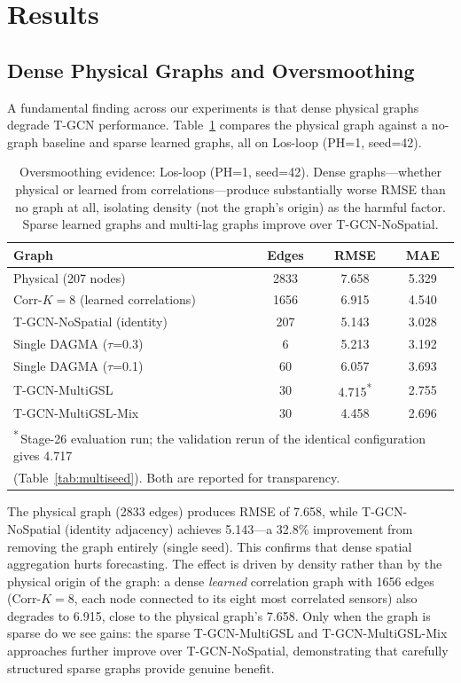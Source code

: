 \section{Results}\label{sec:results}

\subsection{Dense Physical Graphs and Oversmoothing}\label{sec:oversmoothing}

A fundamental finding across our experiments is that dense physical graphs degrade T-GCN performance. Table~\ref{tab:oversmoothing} compares the physical graph against a no-graph baseline and sparse learned graphs, all on Los-loop (PH=1, seed=42).

\begin{table}[t]
\centering
\caption{Oversmoothing evidence: Los-loop (PH=1, seed=42). Dense graphs---whether physical or learned from correlations---produce substantially worse RMSE than no graph at all, isolating density (not the graph's origin) as the harmful factor. Sparse learned graphs and multi-lag graphs improve over T-GCN-NoSpatial.}
\label{tab:oversmoothing}
\begin{tabular}{lccc}
\toprule
\textbf{Graph} & \textbf{Edges} & \textbf{RMSE} & \textbf{MAE} \\
\midrule
Physical (207 nodes) & 2833 & 7.658 & 5.329 \\
Corr-$K{=}8$ (learned correlations) & 1656 & 6.915 & 4.540 \\
T-GCN-NoSpatial (identity) & 207 & 5.143 & 3.028 \\
Single DAGMA ($\tau$=0.3) & 6 & 5.213 & 3.192 \\
Single DAGMA ($\tau$=0.1) & 60 & 6.057 & 3.693 \\
T-GCN-MultiGSL & 30 & 4.715\textsuperscript{*} & 2.755 \\
T-GCN-MultiGSL-Mix & 30 & 4.458 & 2.696 \\
\bottomrule
\multicolumn{4}{l}{\footnotesize \textsuperscript{*}\,Stage-26 evaluation run; the validation rerun of the identical configuration gives 4.717}\\
\multicolumn{4}{l}{\footnotesize (Table~\ref{tab:multiseed}). Both are reported for transparency.}
\end{tabular}
\end{table}

The physical graph (2833 edges) produces RMSE of 7.658, while T-GCN-NoSpatial (identity adjacency) achieves 5.143---a 32.8\% improvement from removing the graph entirely (single seed). This confirms that dense spatial aggregation hurts forecasting. The effect is driven by density rather than by the physical origin of the graph: a dense \emph{learned} correlation graph with 1656 edges (Corr-$K{=}8$, each node connected to its eight most correlated sensors) also degrades to 6.915, close to the physical graph's 7.658. Only when the graph is sparse do we see gains: the sparse T-GCN-MultiGSL and T-GCN-MultiGSL-Mix approaches further improve over T-GCN-NoSpatial, demonstrating that carefully structured sparse graphs provide genuine benefit.

